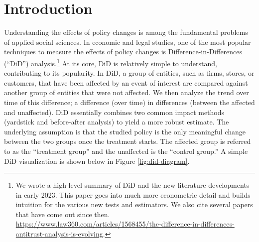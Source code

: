 \documentclass[12pt]{article}
\begin{document}
\tableofcontents

\doublespacing

\newpage
\section{Introduction} \label{sec:introduction}
Understanding the effects of policy changes is among the fundamental problems of applied social sciences. In economic and legal studies, one of the most popular techniques to measure the effects of policy changes is Difference-in-Differences (“DiD”) analysis.\footnote{We wrote a high-level summary of DiD and the new literature developments in early 2023. This paper goes into much more econometric detail and builds intuition for the various new tests and estimators. We also cite several papers that have come out since then. \url{https://www.law360.com/articles/1568455/the-difference-in-differences-antitrust-analysis-is-evolving}.}  At its core, DiD is relatively simple to understand, contributing to its popularity. In DiD, a group of entities, such as firms, stores, or customers, that have been affected by an event of interest are compared against another group of entities that were not affected. We then analyze the trend over time of this difference; a difference (over time) in differences (between the affected and unaffected). DiD essentially combines two common impact methods (yardstick and before-after analysis) to yield a more robust estimate. The underlying assumption is that the studied policy is the only meaningful change between the two groups once the treatment starts. The affected group is referred to as the “treatment group” and the unaffected is the “control group.” A simple DiD visualization is shown below in Figure \ref{fig:did-diagram}.
\end{document}
